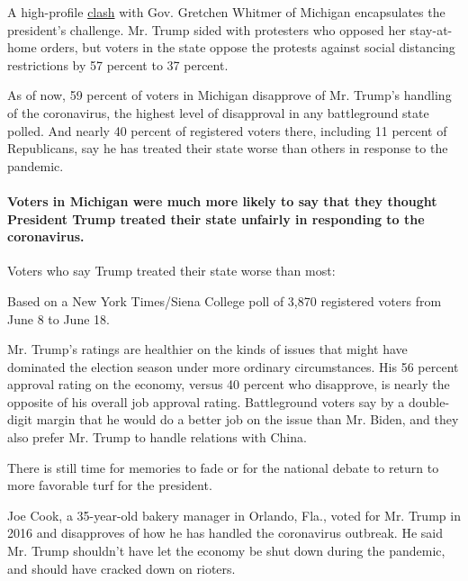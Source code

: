 A high-profile
\href{https://www.nytimes3xbfgragh.onion/2020/05/31/us/politics/michigan-trump-election.html}{clash}
with Gov. Gretchen Whitmer of Michigan encapsulates the president's
challenge. Mr. Trump sided with protesters who opposed her stay-at-home
orders, but voters in the state oppose the protests against social
distancing restrictions by 57 percent to 37 percent.

As of now, 59 percent of voters in Michigan disapprove of Mr. Trump's
handling of the coronavirus, the highest level of disapproval in any
battleground state polled. And nearly 40 percent of registered voters
there, including 11 percent of Republicans, say he has treated their
state worse than others in response to the pandemic.

\hypertarget{voters-in-michigan-were-much-more-likely-to-say-that-they-thought-president-trump-treated-their-state-unfairly-in-responding-to-the-coronavirus}{%
\paragraph{Voters in Michigan were much more likely to say that they
thought President Trump treated their state unfairly in responding to
the
coronavirus.}\label{voters-in-michigan-were-much-more-likely-to-say-that-they-thought-president-trump-treated-their-state-unfairly-in-responding-to-the-coronavirus}}

Voters who say Trump treated their state worse than most:

Based on a New York Times/Siena College poll of 3,870 registered voters
from June 8 to June 18.

Mr. Trump's ratings are healthier on the kinds of issues that might have
dominated the election season under more ordinary circumstances. His 56
percent approval rating on the economy, versus 40 percent who
disapprove, is nearly the opposite of his overall job approval rating.
Battleground voters say by a double-digit margin that he would do a
better job on the issue than Mr. Biden, and they also prefer Mr. Trump
to handle relations with China.

There is still time for memories to fade or for the national debate to
return to more favorable turf for the president.

Joe Cook, a 35-year-old bakery manager in Orlando, Fla., voted for Mr.
Trump in 2016 and disapproves of how he has handled the coronavirus
outbreak. He said Mr. Trump shouldn't have let the economy be shut down
during the pandemic, and should have cracked down on rioters.

